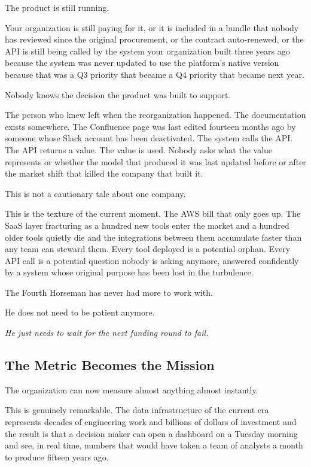 The product is still running.

Your organization is still paying for it, or it is included in a bundle that nobody has reviewed since the original procurement, or the contract auto-renewed, or the API is still being called by the system your organization built three years ago because the system was never updated to use the platform's native version because that was a Q3 priority that became a Q4 priority that became next year.

Nobody knows the decision the product was built to support.

The person who knew left when the reorganization happened. The documentation exists somewhere. The Confluence page was last edited fourteen months ago by someone whose Slack account has been deactivated. The system calls the API. The API returns a value. The value is used. Nobody asks what the value represents or whether the model that produced it was last updated before or after the market shift that killed the company that built it.

This is not a cautionary tale about one company.

This is the texture of the current moment. The AWS bill that only goes up. The SaaS layer fracturing as a hundred new tools enter the market and a hundred older tools quietly die and the integrations between them accumulate faster than any team can steward them. Every tool deployed is a potential orphan. Every API call is a potential question nobody is asking anymore, answered confidently by a system whose original purpose has been lost in the turbulence.

The Fourth Horseman has never had more to work with.

He does not need to be patient anymore.

\textit{He just needs to wait for the next funding round to fail.}

\subsection*{The Metric Becomes the Mission}

The organization can now measure almost anything almost instantly.

This is genuinely remarkable. The data infrastructure of the current era represents decades of engineering work and billions of dollars of investment and the result is that a decision maker can open a dashboard on a Tuesday morning and see, in real time, numbers that would have taken a team of analysts a month to produce fifteen years ago.

